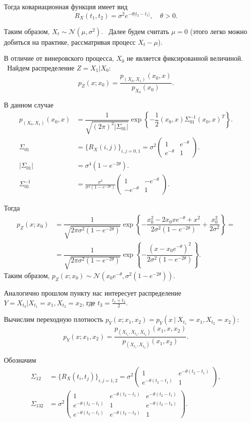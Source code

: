 \documentclass[11pt]{report}
\begin{document}
Тогда ковариационная функция имеет вид
$$
R_X(t_1,t_2)=\sigma^2e^{-\theta|t_2-t_1|},\quad \theta>0.
$$

Таким образом, $X_t\sim\mathcal{N}(\mu,\sigma^2)$. \
Далее будем считать $\mu=0$ (этого легко можно добиться на практике, рассматривая процесс $X_t-\mu$).


В отличие от винеровского процесса, $X_0$ не является фиксированной величиной. \
Найдем распределение $Z = X_1|X_0$:
$$
p_Z(x; x_0) = \dfrac{p_{(X_0,X_1)}(x_0, x)}{p_{X_0}(x_0)}.
$$

В данном случае
$$
\begin{aligned}
p_{(X_0,X_1)}(x_0, x) &= \dfrac{1}{\sqrt{(2\pi)^2|\Sigma_{01}|}} \exp\left\{ -\dfrac{1}{2}(x_0, x)\Sigma_{01}^{-1}(x_0, x)^T \right\}. \\
\Sigma_{01} &= \{ R_X(i,j) \}_{i,j=0,1} = \sigma^2\begin{pmatrix}
1 & e^{-\theta} \\
e^{-\theta} & 1
\end{pmatrix}. \\
|\Sigma_{01}| &= \sigma^4(1-e^{-2\theta}). \\
\Sigma_{01}^{-1} &= \frac{\sigma^2}{\sigma^4(1-e^{-2\theta})}\begin{pmatrix}
1 & -e^{-\theta} \\
-e^{-\theta} & 1
\end{pmatrix}.
\end{aligned}
$$

Тогда
$$
\begin{aligned}
p_Z(x; x_0) &= \dfrac{1}{\sqrt{2\pi\sigma^2(1-e^{-2\theta})}}\exp\left\{
    -\dfrac{x_0^2 - 2x_0xe^{-\theta} + x^2}{2\sigma^2(1-e^{-2\theta})} + \dfrac{x_0^2}{2\sigma^2}
\right\} = \\
&= \dfrac{1}{\sqrt{2\pi\sigma^2(1-e^{-2\theta})}}\exp\left\{
    -\dfrac{(x-x_0e^{-\theta})^2}{2\sigma^2(1-e^{-2\theta})}
\right\}.
\end{aligned}
$$
Таким образом, $p_Z(x; x_0)\sim\mathcal{N}(x_0e^{-\theta},\sigma^2(1-e^{-2\theta}))$.

Аналогично прошлом пункту нас интересует распределение $Y = X_{t_3}|X_{t_1}=x_1,X_{t_2}=x_2$, где $t_3=\frac{t_1+t_2}{2}$.

Вычислим переходную плотность $p_Y(x;x_1,x_2) = p_Y(x ~|~ X_{t_1}=x_1, X_{t_2}=x_2)$:
$$
p_Y(x;x_1,x_2) = \dfrac{p_{(X_{t_1},X_{t_3},X_{t_2})}(x_1, x, x_2)}{p_{(X_{t_1},X_{t_2})}(x_1,x_2)}.
$$

Обозначим
$$
\begin{aligned}
\Sigma_{12} &= \{R_X(t_i,t_j) \}_{i,j=1,2} = \sigma^2\begin{pmatrix}
1 & e^{-\theta(t_2-t_1)} \\
e^{-\theta(t_2-t_1)} & 1
\end{pmatrix}, \\
\Sigma_{132} &= \sigma^2\begin{pmatrix}
1 & e^{-\theta(t_3-t_1)} & e^{-\theta(t_2-t_1)} \\
e^{-\theta(t_3-t_1)} & 1 & e^{-\theta(t_2-t_3)} \\
e^{-\theta(t_2-t_1)} & e^{-\theta(t_2-t_3)} & 1
\end{pmatrix}.
\end{aligned}
$$
\end{document}
